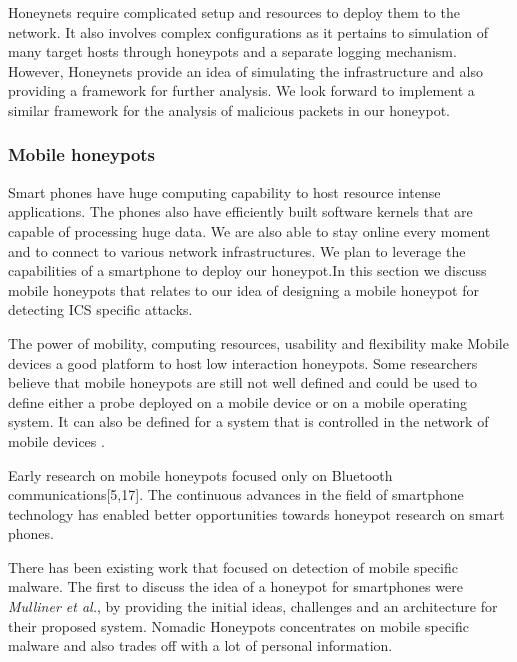 \documentclass[article,msc=informatik,type=msc,colorback,accentcolor=tud9c]{tudthesis}
\begin{document}
	
	\vspace{3mm}
	Honeynets require complicated setup and resources to deploy them to the network. It also involves complex configurations as it pertains to simulation of many target hosts through honeypots and a separate logging mechanism. However, Honeynets provide an idea of simulating the infrastructure and also providing a framework for further analysis. We look forward to implement a similar framework  for the analysis of malicious packets in our honeypot. 
	
	
	\vspace{5mm} 
	\subsubsection  {Mobile honeypots}\label{Mobile honeypots}

	Smart phones have huge computing capability  to host resource intense applications.  The phones also have  efficiently built software kernels that are capable of processing huge data. We are also able to stay online every moment and to connect to various network infrastructures. We plan to leverage the capabilities of a smartphone to deploy our honeypot.In this section we discuss mobile honeypots that relates to our idea of designing a mobile honeypot for detecting \ac{ICS} specific attacks. 
	\vspace{5mm} 
	
	
	The power of mobility, computing resources, usability and flexibility make Mobile devices a good platform to host low interaction honeypots. Some researchers believe that mobile honeypots are still not well defined and could be used to define either a probe deployed on a mobile device or on a mobile operating system. It can also be defined for a system that is controlled in the network of mobile devices \cite{wahlisch2012first}.
	
	\vspace{5mm} 
	
	Early research on mobile honeypots focused only on  Bluetooth communications[5,17]. The continuous advances in the field of smartphone technology has enabled better opportunities towards honeypot research on smart phones. 

	
	There has been existing work that focused on detection of mobile specific malware. The first to discuss the idea of a honeypot for smartphones were \textit{Mulliner et al.}, by providing the initial ideas, challenges and an architecture for their proposed system\cite{mulliner2011poster}. Nomadic Honeypots\cite{Liebergeld_nomadichoneypots:} concentrates on mobile specific malware and also trades off with a lot of personal information.
\end{document}
